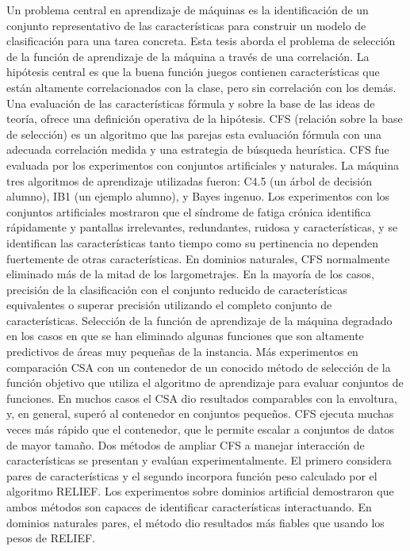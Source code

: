 Un problema central en aprendizaje de máquinas es la identificación de un conjunto representativo de las características para construir un modelo de clasificación para una tarea concreta. Esta tesis aborda el problema de selección de la función de aprendizaje de la máquina a través de una correlación. La hipótesis central es que la buena función juegos contienen características que están altamente correlacionados con la clase, pero sin correlación con los demás. Una evaluación de las características fórmula y sobre la base de las ideas de teoría, ofrece una definición operativa de la hipótesis. CFS (relación sobre la base de selección) es un algoritmo que las parejas esta evaluación fórmula con una adecuada correlación medida y una estrategia de búsqueda heurística.
CFS fue evaluada por los experimentos con conjuntos artificiales y naturales. La máquina tres algoritmos de aprendizaje utilizadas fueron: C4.5 (un árbol de decisión alumno), IB1 (un ejemplo alumno), y Bayes ingenuo. Los experimentos con los conjuntos artificiales mostraron que el síndrome de fatiga crónica identifica rápidamente y pantallas irrelevantes, redundantes, ruidosa y características, y se identifican las características tanto tiempo como su pertinencia no dependen fuertemente de otras características. En dominios naturales, CFS normalmente eliminado más de la mitad de los largometrajes. En la mayoría de los casos, precisión de la clasificación con el conjunto reducido de características equivalentes o superar precisión utilizando el completo conjunto de características. Selección de la función de aprendizaje de la máquina degradado en los casos en que se han eliminado algunas funciones que son altamente predictivos de áreas muy pequeñas de la instancia.
Más experimentos en comparación CSA con un contenedor de un conocido método de selección de la función objetivo que utiliza el algoritmo de aprendizaje para evaluar conjuntos de funciones. En muchos casos el CSA dio resultados comparables con la envoltura, y, en general, superó al contenedor en conjuntos pequeños. CFS ejecuta muchas veces más rápido que el contenedor, que le permite escalar a conjuntos de datos de mayor tamaño.
Dos métodos de ampliar CFS a manejar interacción de características se presentan y evalúan experimentalmente. El primero considera pares de características y el segundo incorpora función peso calculado por el algoritmo RELIEF. Los experimentos sobre dominios artificial demostraron que ambos métodos son capaces de identificar características interactuando. En dominios naturales pares, el método dio resultados más fiables que usando los pesos de RELIEF.


